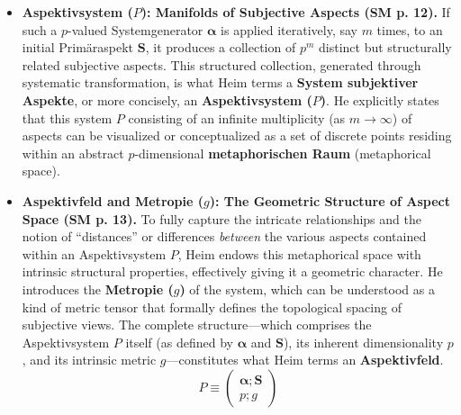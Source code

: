 \documentclass[12pt]{article}
\newcommand{\q}[1]{\enquote{#1}}
\newcommand{\aspektivsystem}{P}
\begin{document}
\begin{itemize}
    \item \textbf{Aspektivsystem (\(\aspektivsystem\)): Manifolds of Subjective Aspects (SM p. 12).}
    If such a \( p \)-valued Systemgenerator \( \bm{\alpha} \) is applied iteratively, say \( m \) times, to an initial Primäraspekt \( \mathbf{S} \), it produces a collection of \( p^m \) distinct but structurally related subjective aspects. This structured collection, generated through systematic transformation, is what Heim terms a \textbf{System subjektiver Aspekte}, or more concisely, an \textbf{Aspektivsystem (\(\aspektivsystem\))}. He explicitly states that this system \( \aspektivsystem \) consisting of an infinite multiplicity (as $m \to \infty$) of aspects can be visualized or conceptualized as a set of discrete points residing within an abstract \( p \)-dimensional \textbf{metaphorischen Raum} (metaphorical space).

    \item \textbf{Aspektivfeld and Metropie (\(g\)): The Geometric Structure of Aspect Space (SM p. 13).}
    To fully capture the intricate relationships and the notion of \q{distances} or differences \textit{between} the various aspects contained within an Aspektivsystem \( \aspektivsystem \), Heim endows this metaphorical space with intrinsic structural properties, effectively giving it a geometric character. He introduces the \textbf{Metropie (\(g\))} of the system, which can be understood as a kind of metric tensor that formally defines the topological spacing of subjective views. The complete structure—which comprises the Aspektivsystem \( \aspektivsystem \) itself (as defined by \( \bm{\alpha} \) and \( \mathbf{S} \)), its inherent dimensionality \( p \), and its intrinsic metric \( g \)—constitutes what Heim terms an \textbf{Aspektivfeld}.
    \begin{equation*}
    \aspektivsystem \equiv \begin{pmatrix} \bm{\alpha};\mathbf{S} \\ p;g \end{pmatrix}
    \end{equation*}


\end{itemize}
\end{document}
